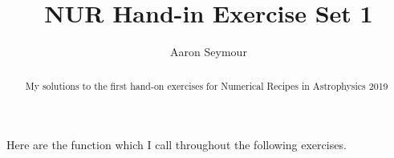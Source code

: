\documentclass[a4paper,10pt]{article}
\title{NUR Hand-in Exercise Set 1}
\author{Aaron Seymour}
\begin{document}
\maketitle

\begin{abstract}
 My solutions to the first hand-on exercises for Numerical Recipes in Astrophysics 2019
\end{abstract}


Here are the function which I call throughout the following exercises.







\end{document}
